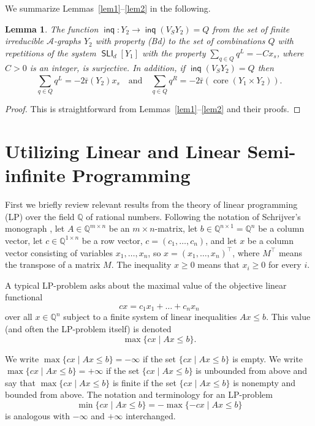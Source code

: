 \documentclass[10pt, reqno]{amsart}
\numberwithin{equation}{section}
\newtheorem{lem}[thm]{Lemma}
\begin{document}
We  summarize Lemmas~\ref{lem1}--\ref{lem2} in the following.

\begin{lem}\label{lem3}  The function $\operatorname{\textsf{inq}} : Y_2 \to \operatorname{\textsf{inq}}(V_S Y_2) = Q$ from the set of finite irreducible ${\mathcal{A}}$-graphs $Y_2$ with property (Bd) to the set of combinations $Q$ with repetitions of the system $\operatorname{\textsf{SLI}}_d[Y_1]$ with the property
$\sum_{q \in Q}^{}q^L = -C x_s $,
where $C>0$ is an integer, is surjective. In addition, if $\operatorname{\textsf{inq}}( V_S Y_2) = Q$ then
\begin{equation*}\label{l2i1}
\sum_{q \in Q}^{}q^L   =    -2{\bar {\mathrm{r}}}(Y_2) x_s \quad  \mbox{and}   \quad
\sum_{q \in  Q}^{  }q^R = - 2{\bar {\mathrm{r}}}(\operatorname{core}(Y_1  \times  Y_2))   .
\end{equation*}
\end{lem}

\begin{proof} This is straightforward  from Lemmas~\ref{lem1}--\ref{lem2} and their proofs.
\end{proof}

\section{Utilizing Linear and Linear Semi-infinite Programming}

First we briefly review relevant results from the theory of linear programming (LP) over the field $\mathbb Q$ of rational numbers. Following the notation of Schrijver's monograph \cite{S86}, let $A \in \mathbb Q^{m\times n}$ be an $m\times n$-matrix, let $b \in \mathbb Q^{n\times 1} = \mathbb Q^{n} $ be a column vector,  let  $c \in \mathbb Q^{1\times n} $ be a row vector, $c=(c_1, \ldots, c_n)$,
and let $x$ be a column vector consisting of variables $x_1, \dots, x_n$, so $x = (x_1, \dots, x_n)^{\top}$, where $M^{\top}$ means the transpose of a matrix $M$.
The inequality $x \ge 0$ means that $x_i \ge 0$ for every $i$.

A typical LP-problem asks about the maximal value of the objective linear functional
$$
cx= c_1x_1+\dots +c_nx_n
$$
over all $x \in \mathbb Q^{n}$ subject to a finite system of linear inequalities $Ax \le b$.
This value (and often the LP-problem itself) is denoted
$$
\max\{ cx \mid Ax \le b  \} .
$$

We write $\max\{ cx \mid Ax \le b    \} = -\infty$ if the set $\{ cx \mid Ax \le b    \}$ is empty. We write $\max\{ cx \mid Ax \le b    \} = +\infty$ if the set $\{ cx \mid Ax \le b    \}$ is unbounded from above and say that
 $\max\{ cx \mid Ax \le b   \} $ is finite if the set $\{ cx \mid Ax \le b    \}$ is nonempty and bounded from above. The notation and terminology for an LP-problem
 $$
 \min\{ cx \mid Ax \le b    \} = -  \max\{ -cx \mid Ax \le b    \}
 $$
 is analogous with
 $-\infty$ and $+\infty$ interchanged.
\end{document}
